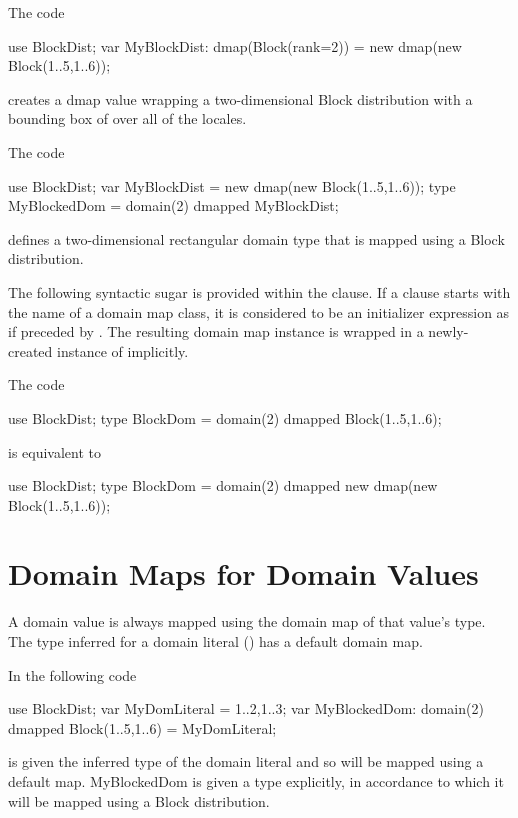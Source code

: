 \begin{example}
The code
\begin{chapel}
use BlockDist;
var MyBlockDist: dmap(Block(rank=2)) = new dmap(new Block({1..5,1..6}));
\end{chapel}
creates a dmap value wrapping a two-dimensional Block distribution with a
bounding box of  over all of the locales.
\end{example}

\begin{example}
The code
\begin{chapel}
use BlockDist;
var MyBlockDist = new dmap(new Block({1..5,1..6}));
type MyBlockedDom = domain(2) dmapped MyBlockDist;
\end{chapel}
defines a two-dimensional rectangular domain type
that is mapped using a Block distribution.
\end{example}

The following syntactic sugar is provided within the  clause.
If a  clause starts with the name of a domain map class,
it is considered to be an initializer expression as if preceded by
. The resulting domain map instance is wrapped in a newly-created
instance of  implicitly.

\begin{example}
The code
\begin{chapel}
use BlockDist;
type BlockDom = domain(2) dmapped Block({1..5,1..6});
\end{chapel}
is equivalent to
\begin{chapel}
use BlockDist;
type BlockDom = domain(2) dmapped new dmap(new Block({1..5,1..6}));
\end{chapel}
\end{example}


\section{Domain Maps for Domain Values}
\label{Domain_Maps_For_Values}

A domain value is always mapped using the domain map of that value's type.
The type inferred for a domain literal ()
has a default domain map.

\begin{example}
In the following code
\begin{chapel}
use BlockDist;
var MyDomLiteral = {1..2,1..3};
var MyBlockedDom: domain(2) dmapped Block({1..5,1..6}) = MyDomLiteral;
\end{chapel}
 is given the inferred type of the domain literal
and so will be mapped using a default map.
MyBlockedDom is given a type explicitly, in accordance to which
it will be mapped using a Block distribution.
\end{example}

